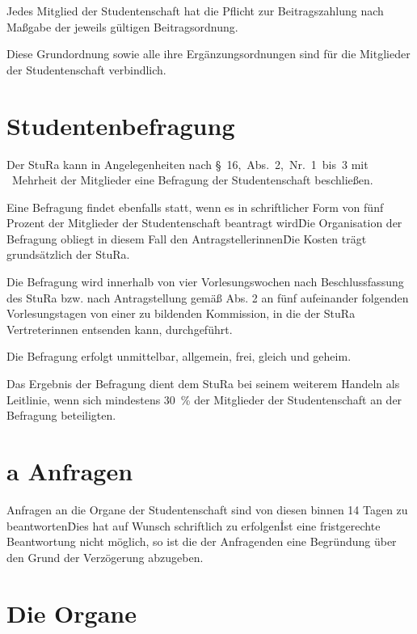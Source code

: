 \begin{multicols}{2}
\Abs \Satz Jedes Mitglied der Studentenschaft hat die Pflicht zur Beitragszahlung nach Maßgabe der jeweils gültigen Beitragsordnung.

\Abs \Satz Diese Grundordnung sowie alle ihre Ergänzungsordnungen sind für die Mitglieder der Studentenschaft verbindlich.



\section{Studentenbefragung}

\Abs \Satz Der StuRa kann in Angelegenheiten nach §~16,~Abs.~2,~Nr.~1~bis~3 mit ~Mehrheit der Mitglieder eine Befragung der Studentenschaft beschließen.

\Abs \Satz Eine Befragung findet ebenfalls statt, wenn es in schriftlicher Form von fünf Prozent der Mitglieder der Studentenschaft beantragt wird\. Die Organisation der Befragung obliegt in diesem Fall den Antragstellerinnen\. Die Kosten trägt grundsätzlich der StuRa.

\Abs \Satz Die Befragung wird innerhalb von vier Vorlesungswochen nach Beschlussfassung des StuRa bzw. nach Antragstellung gemäß Abs. 2 an fünf aufeinander folgenden Vorlesungstagen von einer zu bildenden Kommission, in die der StuRa Vertreterinnen entsenden kann, durchgeführt.

\Abs \Satz Die Befragung erfolgt unmittelbar, allgemein, frei, gleich und geheim.

\Abs \Satz Das Ergebnis der Befragung dient dem StuRa bei seinem weiterem Handeln als Leitlinie, wenn sich mindestens 30~\% der Mitglieder der Studentenschaft an der Befragung beteiligten.


\setcounter{section}{3}
\section{a Anfragen}
\Abs \Satz Anfragen an die Organe der Studentenschaft sind von diesen binnen 14 Tagen zu beantworten\. Dies hat auf Wunsch schriftlich zu erfolgen\. Ist eine fristgerechte Beantwortung nicht möglich, so ist die der Anfragenden eine Begründung über den Grund der Verzögerung abzugeben.
\setcounter{section}{4}



\section{Die Organe}


\end{multicols}
